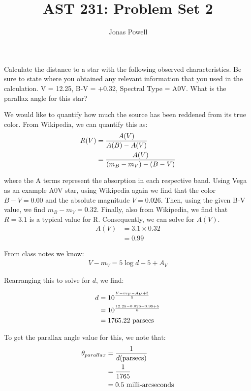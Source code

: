 \documentclass[12pt]{article}
\newenvironment{problem}[2][Problem]{\begin{trivlist}
\item[\hskip \labelsep {\bfseries #1}\hskip \labelsep {\bfseries #2.}]}{\end{trivlist}}
\newenvironment{answer}[2][Answer]{\begin{trivlist}
\item[\hskip \labelsep {\bfseries #1}\hskip \labelsep {\bfseries #2.}]}{\end{trivlist}}
\begin{document}

\title{AST 231: Problem Set 2}
\author{Jonas Powell}
\maketitle

\begin{problem}{1}
Calculate the distance to a star with the following observed characteristics. Be sure to state where you obtained any relevant information that you used in the calculation. V = 12.25, B-V = +0.32, Spectral Type = A0V. What is the parallax angle for this star?
\end{problem}

\begin{answer}{1}
  We would like to quantify how much the source has been reddened from its true color. From Wikipedia, we can quantify this as:
\begin{align}
  R(V) &= \frac{A(V)}{A(B) - A(V)} \notag \\
       &= \frac{A(V)}{ (m_B - m_V) - (B-V)}
\end{align}

where the A terms represent the absorption in each respective band. Using Vega as an example A0V star, using Wikipedia again we find that the color $B-V = 0.00$ and the absolute magnitude $V = 0.026$. Then, using the given B-V value, we find $m_B - m_V = 0.32$. Finally, also from Wikipedia, we find that $R = 3.1$ is a typical value for R. Consequently, we can solve for $A(V)$.
\begin{align*}
  A(V) &= 3.1 \times 0.32 \\
       &= 0.99
\end{align*}

From class notes we know:
\begin{align}
  V - m_V = 5 \log {d} - 5 + A_V
\end{align}

Rearranging this to solve for $d$, we find:

\begin{align}
  d &= 10^{ \frac{V - m_V - A_V + 5}{5}} \notag \\
    &= 10^{ \frac{12.25 - 0.026 - 0.99 + 5}{5}} \notag \\
    &= 1765.22 \text{ parsecs}
\end{align}

To get the parallax angle value for this, we note that:
\begin{align}
  \theta_{parallax} &= \frac{1}{d(\text{parsecs})} \notag  \\
                    &= \frac{1}{1765} \notag \\
                    &= 0.5 \text{ milli-arcseconds}
\end{align}

\end{answer}
\end{document}
